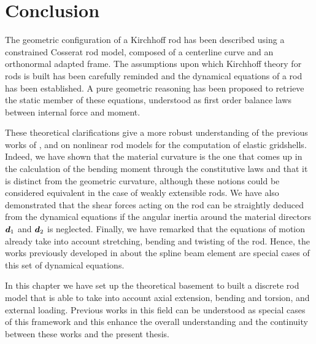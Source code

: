 \section{Conclusion}
The geometric configuration of a Kirchhoff rod has been described using a constrained Cosserat rod model, composed of a centerline curve and an orthonormal adapted frame. The assumptions upon which Kirchhoff theory for rods is built has been carefully reminded and the dynamical equations of a rod has been established. A pure geometric reasoning has been proposed to retrieve the static member of these equations, understood as first order balance laws between internal force and moment.

These theoretical clarifications give a more robust understanding of the previous works of ,  and  on nonlinear rod models for the computation of elastic gridshells. Indeed, we have shown that the material curvature is the one that comes up in the calculation of the bending moment through the constitutive laws and that it is distinct from the geometric curvature, although these notions could be considered equivalent in the case of weakly extensible rods. We have also demonstrated that the shear forces acting on the rod can be straightly deduced from the dynamical equations if the angular inertia around the material directors $\boldsymbol{d}_1$ and $\boldsymbol{d}_2$ is neglected. Finally, we have remarked that the equations of motion already take into account stretching, bending and twisting of the rod. Hence, the works previously developed in \cite{Adriaenssens1999,Douthe2007} about the  spline beam element are special cases of this set of dynamical equations.

In this chapter we have set up the theoretical basement to built a discrete rod model that is able to take into account axial extension, bending and torsion, and external loading. Previous works in this field can be understood as special cases of this framework and this enhance the overall understanding and the continuity between these works and the present thesis.

%
%


